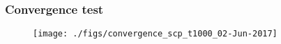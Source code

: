 \begin{frame}\frametitle{Convergence test}
  \begin{figure}
    \centering
    \texttt{[image: ./figs/convergence\_scp\_t1000\_02-Jun-2017]}\hfill

  \end{figure}
\end{frame}

